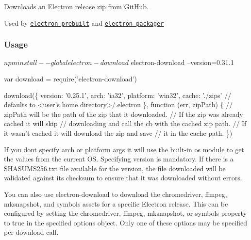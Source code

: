 \href{https://travis-ci.org/electron-userland/electron-download}{\tt } \href{https://ci.appveyor.com/project/Atom/electron-download}{\tt }

\href{https://www.npmjs.com/package/electron-download}{\tt }

Downloads an Electron release zip from Git\+Hub.

Used by \href{https://npmjs.org/electron-prebuilt}{\tt electron-\/prebuilt} and \href{https://npmjs.org/electron-packager}{\tt electron-\/packager}

\subsubsection*{Usage}


\begin{DoxyCode}
$ npm install --global electron-download
$ electron-download --version=0.31.1
\end{DoxyCode}



\begin{DoxyCode}
var download = require('electron-download')

download(\{
  version: '0.25.1',
  arch: 'ia32',
  platform: 'win32',
  cache: './zips' // defaults to <user's home directory>/.electron
\}, function (err, zipPath) \{
  // zipPath will be the path of the zip that it downloaded.
  // If the zip was already cached it will skip
  // downloading and call the cb with the cached zip path.
  // If it wasn't cached it will download the zip and save
  // it in the cache path.
\})
\end{DoxyCode}


If you don\textquotesingle{}t specify {\ttfamily arch} or {\ttfamily platform} args it will use the built-\/in {\ttfamily os} module to get the values from the current OS. Specifying {\ttfamily version} is mandatory. If there is a {\ttfamily S\+H\+A\+S\+U\+M\+S256.\+txt} file available for the {\ttfamily version}, the file downloaded will be validated against its checksum to ensure that it was downloaded without errors.

You can also use {\ttfamily electron-\/download} to download the {\ttfamily chromedriver}, {\ttfamily ffmpeg}, {\ttfamily mksnapshot}, and symbols assets for a specific Electron release. This can be configured by setting the {\ttfamily chromedriver}, {\ttfamily ffmpeg}, {\ttfamily mksnapshot}, or {\ttfamily symbols} property to {\ttfamily true} in the specified options object. Only one of these options may be specified per download call.

